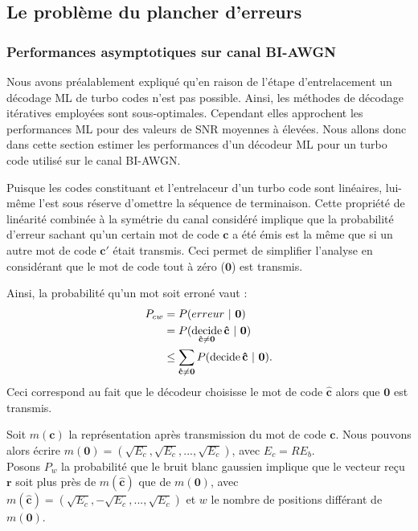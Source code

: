 \subsection{Le problème du plancher d'erreurs}

\subsubsection{Performances asymptotiques sur canal BI-AWGN}
Nous avons préalablement expliqué qu'en raison de l'étape d'entrelacement un décodage ML de turbo codes n'est pas possible. Ainsi, les méthodes de décodage itératives employées sont sous-optimales. Cependant elles approchent les performances ML pour des valeurs de SNR moyennes à élevées.
Nous allons donc dans cette section estimer les performances d'un décodeur ML pour un turbo code utilisé sur le canal BI-AWGN.

Puisque les codes constituant et l'entrelaceur d'un turbo code sont linéaires, lui-même l'est sous réserve d'omettre la séquence de terminaison. Cette propriété de linéarité combinée à la symétrie du canal considéré implique que la probabilité d'erreur sachant qu'un certain mot de code $\mathbf{c}$ a été émis est la même que si un autre mot de code $\mathbf{c'}$ était transmis. Ceci permet de simplifier l'analyse en considérant que le mot de code tout à zéro ($\mathbf{0}$) est transmis.

Ainsi, la probabilité qu'un mot soit erroné vaut : 
\begin{align}\label{eq:err}
	P_{cw} & = P(erreur~|~\mathbf{0}) \notag                                                             \\
	       & = P( \operatorname*{decide}\limits_{\mathbf{\hat{c}}\neq \mathbf{0}} \mathbf{\hat{c}}~|~\mathbf{0}) \notag \\
	       & \le \sum\limits_{\mathbf{\hat{c}}\neq \mathbf{0}}P( \operatorname*{decide} \mathbf{\hat{c}}~|~\mathbf{0}). 
\end{align}
Ceci correspond au fait que le décodeur choisisse le mot de code $\mathbf{\hat{c}}$ alors que $\mathbf{0}$ est transmis.

Soit $m(\mathbf{c})$ la représentation après transmission du mot de code $\mathbf{c}$. Nous pouvons alors écrire $m(\mathbf{0}) = (\sqrt{E_c},\sqrt{E_c},...,\sqrt{E_c})$, avec $E_c = RE_b$.\\
Posons $P_w$ la probabilité que le bruit blanc gaussien implique que le vecteur reçu $\mathbf{r}$ soit plus près de  $m(\mathbf{\hat{c}})$ que de $m(\mathbf{0})$, avec $m(\mathbf{\hat{c}}) = (\sqrt{E_c},-\sqrt{E_c},...,\sqrt{E_c})$ et $w$ le nombre de positions différant de $m(\mathbf{0})$.

